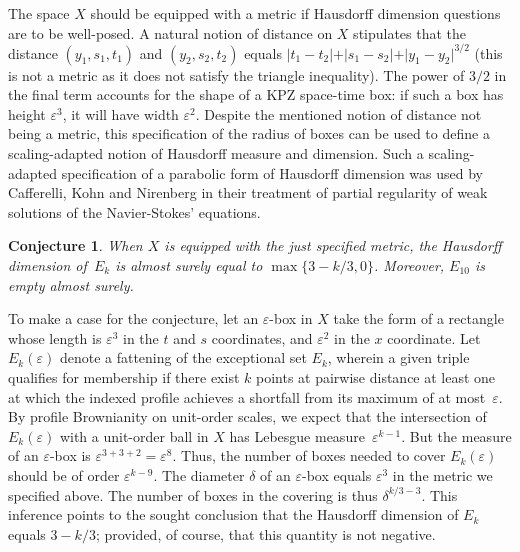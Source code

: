 \documentclass[oneside,final,11pt]{amsart}
\newtheorem{conjec}[thm]{Conjecture}
\theoremstyle{definition}
\newcommand{\1}[1]{\mathbf{1}_{#1}}
\newcommand{\eps}{\varepsilon}
\newcommand{\ah}[1]{\marginnote{\tiny{\color{green!65!black}[AH: #1]}}}
\newcommand{\ic}[1]{\marginnote{\tiny{\color{green!65!black}[IC: #1]}}}
\numberwithin{equation}{section}
\begin{document}
The space $X$ should be equipped with a metric if Hausdorff dimension questions are to be well-posed.
A natural notion of distance on $X$ stipulates that the distance
$(y_1,s_1,t_1)$ and $(y_2,s_2,t_2)$
equals
$\vert t_1 - t_2 \vert + \vert s_1 - s_2 \vert + \vert y_1 - y_2 \vert^{3/2}$ (this is not a metric as it does not satisfy the triangle inequality).
The power of $3/2$ in the final term accounts for the shape of a KPZ space-time box: if such a box has height $\eps^3$, it will have width $\eps^2$. Despite the mentioned notion of distance not being a metric, this specification of the radius of boxes can be used to define a scaling-adapted notion of Hausdorff measure and dimension.
Such a scaling-adapted specification of a parabolic form of Hausdorff dimension was used by Cafferelli, Kohn and Nirenberg \cite{caffarelli1982partial} in their treatment of partial regularity of weak solutions of the Navier-Stokes' equations.%


\begin{conjec}
When $X$ is equipped with the just specified metric, the Hausdorff dimension of~$E_k$ is almost surely equal to $\max \{ 3-k/3, 0\}$.
Moreover, $E_{10}$ is empty almost surely.
\end{conjec}
To make a case for the conjecture, let an $\eps$-box in $X$ take the form of a rectangle whose length is $\eps^3$ in the $t$ and $s$ coordinates, and $\eps^2$ in the $x$ coordinate.
Let $E_k(\eps)$ denote a fattening of the exceptional set $E_k$, wherein a given triple qualifies for membership if there exist $k$ points at pairwise distance at least one at which  the indexed profile achieves a shortfall from its maximum of at most~$\eps$.
By profile Brownianity on unit-order scales, we expect that the intersection of $E_k(\eps)$ with a unit-order ball in $X$ has Lebesgue measure~$\eps^{k-1}$.
But the measure of an $\eps$-box is $\eps^{3 + 3 + 2} = \eps^{8}$.
Thus, the number of boxes needed to cover $E_k(\eps)$ should be of order $\eps^{k-9}$.
The diameter $\delta$ of an $\eps$-box equals $\eps^3$ in the metric we specified above.
The number of boxes in the covering is thus $\delta^{k/3 - 3}$.
This inference points to the sought conclusion that
the Hausdorff dimension of $E_k$ equals $3 - k/3$; provided, of course, that this quantity is not negative.
\end{document}
